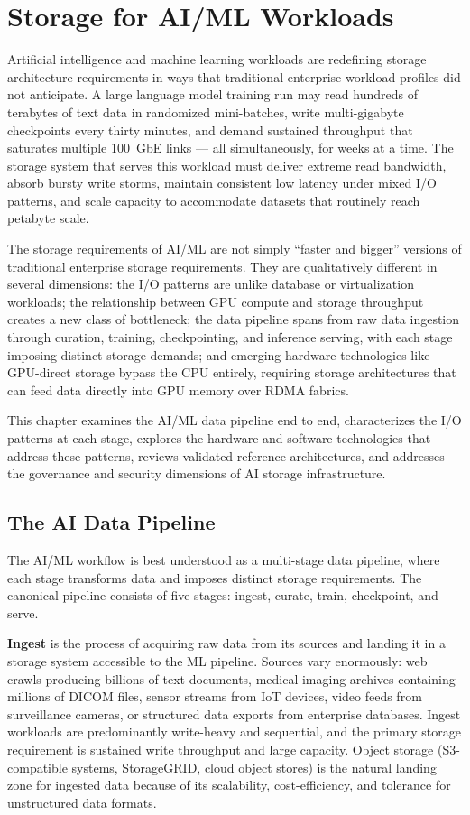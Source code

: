 \chapter{Storage for AI/ML Workloads}
\label{ch:18}

Artificial intelligence and machine learning workloads are redefining storage
architecture requirements in ways that traditional enterprise workload profiles
did not anticipate. A large language model training run may read hundreds of
terabytes of text data in randomized mini-batches, write multi-gigabyte
checkpoints every thirty minutes, and demand sustained throughput that
saturates multiple 100~GbE links --- all simultaneously, for weeks at a time.
The storage system that serves this workload must deliver extreme read
bandwidth, absorb bursty write storms, maintain consistent low latency under
mixed I/O patterns, and scale capacity to accommodate datasets that routinely
reach petabyte scale.

The storage requirements of AI/ML are not simply ``faster and bigger'' versions
of traditional enterprise storage requirements. They are qualitatively
different in several dimensions: the I/O patterns are unlike database or
virtualization workloads; the relationship between GPU compute and storage
throughput creates a new class of bottleneck; the data pipeline spans from raw
data ingestion through curation, training, checkpointing, and inference
serving, with each stage imposing distinct storage demands; and emerging
hardware technologies like GPU-direct storage bypass the CPU entirely,
requiring storage architectures that can feed data directly into GPU memory
over RDMA fabrics.

This chapter examines the AI/ML data pipeline end to end, characterizes the
I/O patterns at each stage, explores the hardware and software technologies
that address these patterns, reviews validated reference architectures, and
addresses the governance and security dimensions of AI storage infrastructure.

\section{The AI Data Pipeline}

The AI/ML workflow is best understood as a multi-stage data pipeline, where
each stage transforms data and imposes distinct storage requirements. The
canonical pipeline consists of five stages: ingest, curate, train, checkpoint,
and serve.

\textbf{Ingest} is the process of acquiring raw data from its sources and
landing it in a storage system accessible to the ML pipeline. Sources vary
enormously: web crawls producing billions of text documents, medical imaging
archives containing millions of DICOM files, sensor streams from IoT devices,
video feeds from surveillance cameras, or structured data exports from
enterprise databases. Ingest workloads are predominantly write-heavy and
sequential, and the primary storage requirement is sustained write throughput
and large capacity. Object storage (S3-compatible systems, StorageGRID, cloud
object stores) is the natural landing zone for ingested data because of its
scalability, cost-efficiency, and tolerance for unstructured data formats.

